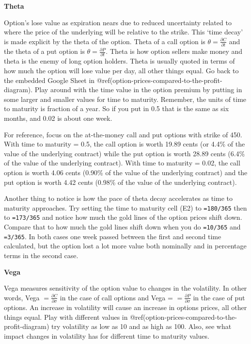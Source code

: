 \documentclass[
  letterpaper,
  DIV=11,
  numbers=noendperiod]{scrreprt}
\begin{document}
\textbf{Theta}

Option's lose value as expiration nears due to reduced uncertainty
related to where the price of the underlying will be relative to the
strike. This `time decay' is made explicit by the theta of the option.
Theta of a call option is \(\theta = \frac{\partial C}{\partial t}\) and
the theta of a put option is \(\theta = \frac{\partial P}{\partial t}\).
Theta is how option sellers make money and theta is the enemy of long
option holders. Theta is usually quoted in terms of how much the option
will lose value per day, all other things equal. Go back to the embedded
Google Sheet in @ref(option-prices-compared-to-the-profit-diagram). Play
around with the time value in the option premium by putting in some
larger and smaller values for time to maturity. Remember, the units of
time to maturity is fraction of a year. So if you put in 0.5 that is the
same as six months, and 0.02 is about one week.

For reference, focus on the at-the-money call and put options with
strike of 450. With time to maturity = 0.5, the call option is worth
19.89 cents (or 4.4\% of the value of the underlying contract) while the
put option is worth 28.89 cents (6.4\% of the value of the underlying
contract). With time to maturity = 0.02, the call option is worth 4.06
cents (0.90\% of the value of the underlying contract) and the put
option is worth 4.42 cents (0.98\% of the value of the underlying
contract).

Another thing to notice is how the pace of theta decay accelerates as
time to maturity approaches. Try setting the time to maturity cell (E2)
to \texttt{=180/365} then to \texttt{=173/365} and notice how much the
gold lines of the option prices shift down. Compare that to how much the
gold lines shift down when you do \texttt{=10/365} and \texttt{=3/365}.
In both cases one week passed between the first and second time
calculated, but the option lost a lot more value both nominally and in
percentage terms in the second case.

\textbf{Vega}

Vega measures sensitivity of the option value to changes in the
volatility. In other words, Vega
\(= \frac{\partial C}{\partial \sigma}\) in the case of call options and
Vega = \(= \frac{\partial P}{\partial \sigma}\) in the case of put
options. An increase in volatility will cause an increase in options
prices, all other things equal. Play with different values in
@ref(option-prices-compared-to-the-profit-diagram) try volatility as low
as 10 and as high as 100. Also, see what impact changes in volatility
has for different time to maturity values.
\end{document}
